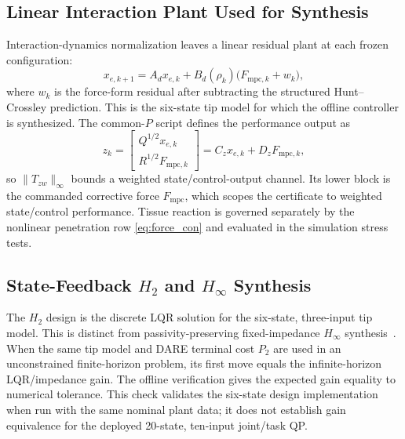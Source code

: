 \subsection{Linear Interaction Plant Used for Synthesis}

Interaction-dynamics normalization leaves a linear residual plant at each frozen configuration:
\begin{equation}
x_{e,k+1}=A_dx_{e,k}+B_d(\rho_k)\big(F_{\mathrm{mpc},k}+w_k\big),
\label{eq:genplant}
\end{equation}
where $w_k$ is the force-form residual after subtracting the structured Hunt--Crossley prediction. This is the six-state tip model for which the offline controller is synthesized. The common-$P$ script defines the performance output as
\begin{equation}
z_k=
\begin{bmatrix}Q^{1/2}x_{e,k}\\R^{1/2}F_{\mathrm{mpc},k}\end{bmatrix}
=C_zx_{e,k}+D_zF_{\mathrm{mpc},k},
\end{equation}
so $\|T_{zw}\|_\infty$ bounds a weighted state/control-output channel. Its lower block is the commanded corrective force $F_{\mathrm{mpc}}$, which scopes the certificate to weighted state/control performance. Tissue reaction is governed separately by the nonlinear penetration row \eqref{eq:force_con} and evaluated in the simulation stress tests.

\subsection{State-Feedback $H_2$ and $H_\infty$ Synthesis}

The $H_2$ design is the discrete LQR solution for the six-state, three-input tip model. This is distinct from passivity-preserving fixed-impedance $H_\infty$ synthesis~\cite{larby2022}. When the same tip model and DARE terminal cost $P_2$ are used in an unconstrained finite-horizon problem, its first move equals the infinite-horizon LQR/impedance gain. The offline verification gives
the expected gain equality to numerical tolerance. This check validates the
six-state design implementation when run with the same nominal plant data;
it does not establish gain equivalence for the deployed 20-state, ten-input
joint/task QP.

